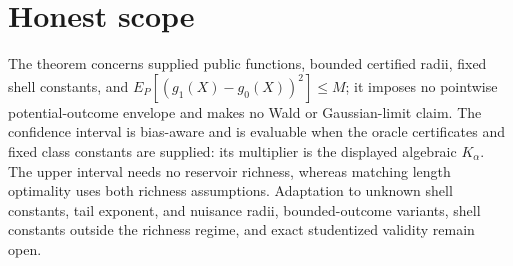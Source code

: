 \documentclass{article}
\begin{document}
\section{Honest scope}

The theorem concerns supplied public functions, bounded certified radii, fixed shell constants, and \(E_P[(g_1(X)-g_0(X))^2]\leq M\); it imposes no pointwise potential-outcome envelope and makes no Wald or Gaussian-limit claim.  The confidence interval is bias-aware and is evaluable when the oracle certificates and fixed class constants are supplied: its multiplier is the displayed algebraic \(K_\alpha\).  The upper interval needs no reservoir richness, whereas matching length optimality uses both richness assumptions.  Adaptation to unknown shell constants, tail exponent, and nuisance radii, bounded-outcome variants, shell constants outside the richness regime, and exact studentized validity remain open.
\end{document}
